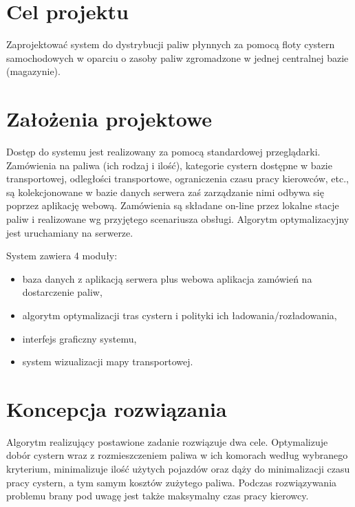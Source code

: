 \documentclass[11pt,a4paper,oneside]{mwart}
\begin{document}


\newpage
\thispagestyle{empty}
\newpage

\setcounter{tocdepth}{3}
\tableofcontents
\newpage


\section{Cel projektu}
Zaprojektować system do dystrybucji paliw płynnych za pomocą floty cystern samochodowych w oparciu o zasoby paliw zgromadzone w jednej centralnej bazie (magazynie).

\section{Założenia projektowe}
Dostęp do systemu jest realizowany za pomocą standardowej przeglądarki. Zamówienia na paliwa (ich rodzaj i ilość), kategorie cystern dostępne w bazie transportowej, odległości transportowe, ograniczenia czasu pracy kierowców, etc., są kolekcjonowane w bazie danych serwera zaś zarządzanie nimi odbywa się poprzez aplikację webową. Zamówienia są składane on-line przez lokalne stacje paliw i realizowane wg przyjętego scenariusza obsługi. Algorytm optymalizacyjny jest uruchamiany na serwerze.

System zawiera 4 moduły: 
\begin{itemize}
  \item baza danych z aplikacją serwera plus webowa aplikacja zamówień na dostarczenie paliw, 
  \item algorytm optymalizacji tras cystern i polityki ich ładowania/rozładowania, 
  \item interfejs graficzny systemu, 
  \item system wizualizacji mapy transportowej.
\end{itemize}


\section {Koncepcja rozwiązania}

Algorytm realizujący postawione zadanie rozwiązuje dwa cele. Optymalizuje dobór cystern wraz z rozmieszczeniem paliwa w ich komorach według wybranego kryterium, minimalizuje ilość użytych pojazdów oraz dąży do minimalizacji czasu pracy cystern, a tym samym kosztów zużytego paliwa. Podczas rozwiązywania problemu brany pod uwagę jest także maksymalny czas pracy kierowcy.
\end{document}
